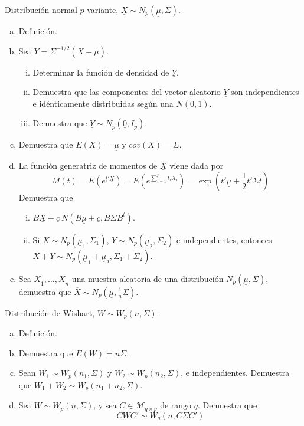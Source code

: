\documentclass[twoside]{article}
\newcommand{\media}[1]{{\overline{#1}}}
\newcommand{\muestra}[1]{{\underline{#1}}}
\newcommand{\m}[1]{{\muestra{#1}}}
\newcommand{\mX}{{\muestra{X}}}
\begin{document}
\begin{ejercicio}{1.2}
Distribución normal $p$-variante, $\mX \sim N_p(\m{μ},Σ)$.
\begin{enumerate}[(a)]
\item Definición.
\item Sea $\m{Y} = Σ^{-1/2}(\mX - \m{μ})$.
\begin{enumerate}[i.]
  \item Determinar la función de densidad de $\m{Y}$.
  \item Demuestra que las componentes del vector aleatorio $\m{Y}$ son independientes e idénticamente distribuidas según una $N(0,1)$.
  \item Demuestra que $\m{Y} \sim N_p(\m{0},I_p)$.
\end{enumerate}
\item Demuestra que $E(\mX) = \m{μ}$ y $cov(\m{X}) = Σ$.
\item La función generatriz de momentos de $\m{X}$ viene dada por
\[ M(\m{t}) = E\left(e^{\m{t}'\mX}\right) = E\left(e^{\sum_{i=1}^p t_i X_i}\right) = \exp\left(\m{t}'\m{μ} + \frac{1}{2}\m{t}'Σ\m{t}\right)\]
Demuestra que
\begin{enumerate}[i.]
\item $B \mX + \m{c} ~ N(B \m{μ} + \m{c}, B Σ B^t)$.
\item Si $\mX \sim N_p(\m{μ}_1,Σ_1)$, $\m{Y} \sim N_p(\m{μ}_2,Σ_2)$ e independientes, entonces $\mX+\m{Y} \sim N_p(\m{μ}_1+\m{μ}_2, Σ_1+Σ_2)$.
\end{enumerate}
\item Sea $\mX_1,\dots,\mX_n$ una muestra aleatoria de una distribución $N_p(\m{μ},Σ)$, demuestra que $\media{\m{X}} \sim N_p(\m{μ}, \frac{1}{n}Σ)$.
\end{enumerate}
\end{ejercicio}

\newpage

\begin{ejercicio}{1.3}
Distribución de Wishart, $W \sim W_p(n,Σ)$.
\begin{enumerate}[(a)]
\item Definición.
\item Demuestra que $E(W) = nΣ$.
\item Sean $W_1 \sim W_p(n_1,Σ)$ y $W_2 \sim W_p(n_2,Σ)$, e independientes. Demuestra que $W_1 + W_2 \sim W_p(n_1+n_2,Σ)$.
\item Sea $W \sim W_p(n,Σ)$, y sea $C \in \mathcal{M}_{q\times p}$ de rango $q$. Demuestra que
\[ C W C' \sim W_q(n, CΣC') \]
\end{enumerate}
\end{ejercicio}
\end{document}
